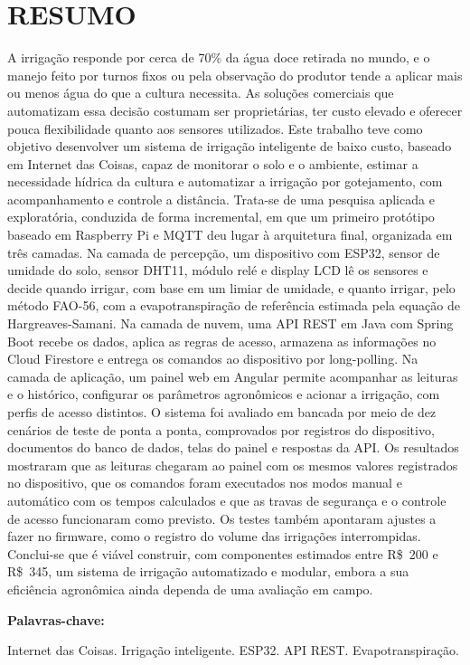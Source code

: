 \chapter*{RESUMO} 
\thispagestyle{empty}

A irrigação responde por cerca de 70\% da água doce retirada no mundo, e o manejo feito por turnos fixos ou pela observação do produtor tende a aplicar mais ou menos água do que a cultura necessita. As soluções comerciais que automatizam essa decisão costumam ser proprietárias, ter custo elevado e oferecer pouca flexibilidade quanto aos sensores utilizados. Este trabalho teve como objetivo desenvolver um sistema de irrigação inteligente de baixo custo, baseado em Internet das Coisas, capaz de monitorar o solo e o ambiente, estimar a necessidade hídrica da cultura e automatizar a irrigação por gotejamento, com acompanhamento e controle a distância. Trata-se de uma pesquisa aplicada e exploratória, conduzida de forma incremental, em que um primeiro protótipo baseado em Raspberry Pi e MQTT deu lugar à arquitetura final, organizada em três camadas. Na camada de percepção, um dispositivo com ESP32, sensor de umidade do solo, sensor DHT11, módulo relé e display LCD lê os sensores e decide quando irrigar, com base em um limiar de umidade, e quanto irrigar, pelo método FAO-56, com a evapotranspiração de referência estimada pela equação de Hargreaves-Samani. Na camada de nuvem, uma API REST em Java com Spring Boot recebe os dados, aplica as regras de acesso, armazena as informações no Cloud Firestore e entrega os comandos ao dispositivo por long-polling. Na camada de aplicação, um painel web em Angular permite acompanhar as leituras e o histórico, configurar os parâmetros agronômicos e acionar a irrigação, com perfis de acesso distintos. O sistema foi avaliado em bancada por meio de dez cenários de teste de ponta a ponta, comprovados por registros do dispositivo, documentos do banco de dados, telas do painel e respostas da API. Os resultados mostraram que as leituras chegaram ao painel com os mesmos valores registrados no dispositivo, que os comandos foram executados nos modos manual e automático com os tempos calculados e que as travas de segurança e o controle de acesso funcionaram como previsto. Os testes também apontaram ajustes a fazer no firmware, como o registro do volume das irrigações interrompidas. Conclui-se que é viável construir, com componentes estimados entre R\$~200 e R\$~345, um sistema de irrigação automatizado e modular, embora a sua eficiência agronômica ainda dependa de uma avaliação em campo.

\vspace{2cm}
{\Large \textbf{Palavras-chave:}}
\vspace{0.4cm}

Internet das Coisas. Irrigação inteligente. ESP32. API REST. Evapotranspiração.

